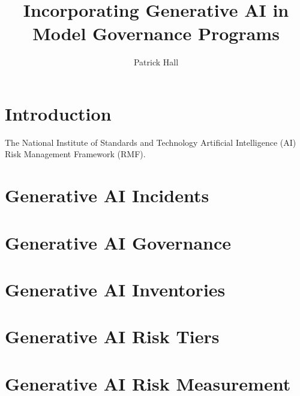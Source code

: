 \documentclass[fleqn]{article}
\title{Incorporating Generative AI in Model Governance Programs}
\author{Patrick Hall}
\begin{document}
\maketitle

\begin{abstract}
	
	
\end{abstract}

\section{Introduction} \label{sec:intro}

The National Institute of Standards and Technology Artificial Intelligence (AI) Risk Management Framework (RMF).\cite{airmf}

\section{Generative AI Incidents}\label{sec:incident}

\section{Generative AI Governance}\label{sec:govern}


\section{Generative AI Inventories}\label{sec:inv}

\section{Generative AI Risk Tiers}\label{sec:tiers}

\section{Generative AI Risk Measurement}\label{sec:measure}

\end{document}
